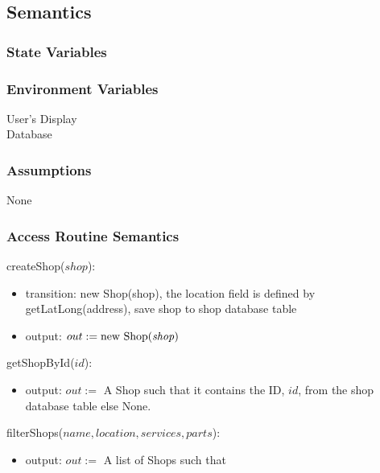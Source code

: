 \documentclass[12pt, titlepage]{article}
\begin{document}
\subsection{Semantics}

\subsubsection{State Variables}

\subsubsection{Environment Variables}

User's Display \\ Database

\subsubsection{Assumptions}

None

\subsubsection{Access Routine Semantics}

\noindent createShop($shop$):
\begin{itemize}
	\item transition: new Shop(shop), the location field is defined by getLatLong(address), save shop to shop
	      database table
	\item output: $out := \text{new Shop(\emph{shop})}$
\end{itemize}

\noindent getShopById($id$):
\begin{itemize}
	\item output: $out :=$ A Shop such that it contains the ID, $id$, from the shop database table else None.
\end{itemize}

\noindent filterShops($name, location, services, parts$):
\begin{itemize}
	\item output: $out :=$ A list of Shops such that
\end{itemize}
\end{document}
